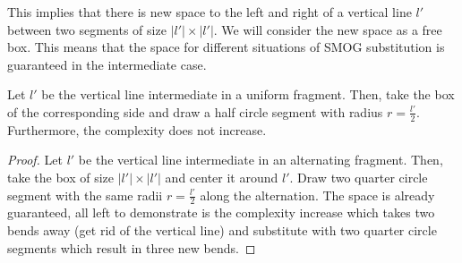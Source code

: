 This implies that there is new space to the left and right of a vertical line $l'$ between two segments of size $|l'|\times|l'|$. We will consider the new space as a free \grqq box\grqq. This means that the space for different situations of SMOG substitution is guaranteed in the intermediate case.
\begin{lemma}
Let $l'$ be the vertical line intermediate in a uniform fragment. Then, take the box of the corresponding side and draw a half circle segment with radius $r = \frac{l'}{2}$. Furthermore, the complexity does not increase.
\end{lemma}
\begin{proof}
	Let $l'$ be the vertical line intermediate in an alternating fragment. Then, take the box of size $|l'| \times |l'|$ and center it around $l'$. Draw two quarter circle segment with the same radii $r = \frac{l'}{2}$ along the alternation. The space is already guaranteed, all left to demonstrate is the complexity increase which takes two bends away (get rid of the vertical line) and substitute with two quarter circle segments which result in three new bends.
\end{proof}
